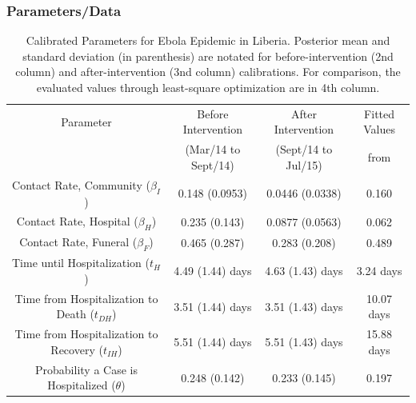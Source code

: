 \documentclass[30pt]{beamer}
\begin{document}
\begin{frame}
\frametitle{Parameters/Data}
\begin{table}[ht]
\caption{Calibrated Parameters for Ebola Epidemic in Liberia. Posterior mean and standard deviation (in parenthesis) are notated for before-intervention (2nd column) and after-intervention (3nd column) calibrations. For comparison, the evaluated values through least-square optimization \cite{Rivers2014} are in 4th column.} %
\centering %
\begin{tabular}{c c c c}
\hline\hline %
Parameter &  Before Intervention  & After Intervention & Fitted Values\\ [0.5ex]
 & (Mar/14 to Sept/14) &  (Sept/14 to Jul/15) & from \cite{Rivers2014}\\ [0.5ex] %
\hline %
{Contact Rate, Community  (${\beta_{I}}$) }& {0.148 (0.0953)} & {0.0446 (0.0338)} & 0.160 \\
Contact Rate, Hospital  ($\beta_{H}$) & 0.235 (0.143) & 0.0877 (0.0563) & 0.062\\
Contact Rate, Funeral  ($\beta_{F}$) & 0.465 (0.287)& 0.283 (0.208) & 0.489 \\
Time until Hospitalization (${t_{H}}$) & 4.49 (1.44) days & 4.63 (1.43) days & 3.24 days  \\
Time from Hospitalization to Death (${t_{DH}}$) & 3.51 (1.44) days & 3.51 (1.43) days  & 10.07 days\\
Time from Hospitalization to Recovery (${t_{IH}}$) & 5.51 (1.44) days & 5.51 (1.43) days  & 15.88 days\\
Probability a Case is Hospitalized ($\theta$) & 0.248 (0.142) & 0.233 (0.145) & 0.197\\
[1ex]
\hline
\end{tabular}
\label{tab:calibratedParameters}
\end{table}
\end{frame}
\end{document}
